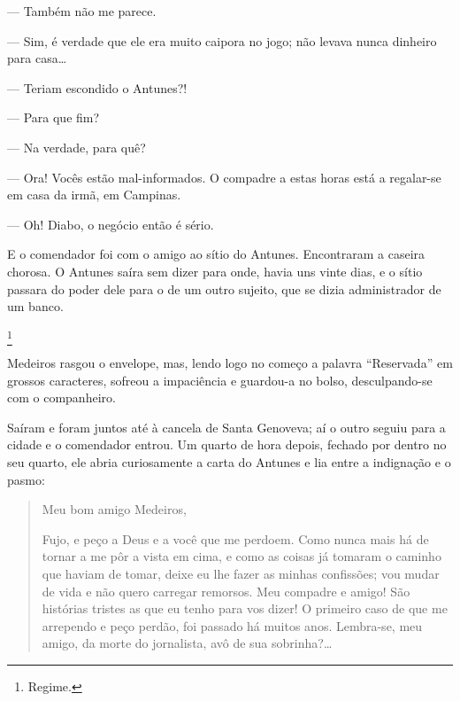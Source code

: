 {--- Também não me parece.

--- Sim, é verdade que ele era muito caipora no jogo; não levava
nunca dinheiro para casa\ldots{}

--- Teriam escondido o Antunes?!

--- Para que fim?

--- Na verdade, para quê?

--- Ora! Vocês estão mal-informados. O compadre a estas
horas está a regalar-se em casa da irmã, em Campinas.


--- Oh! Diabo, o negócio então é sério.

E o comendador foi com o amigo ao sítio do Antunes.
Encontraram a caseira chorosa. O Antunes saíra sem dizer para onde,
havia uns vinte dias, e o sítio passara do poder dele para o de
um outro sujeito, que se dizia administrador de um banco.

\footnote{Regime.}



Medeiros rasgou o envelope, mas, lendo logo no começo a palavra
``Reservada'' em grossos caracteres, sofreou a
impaciência e guardou-a no bolso, desculpando-se com o
companheiro.

Saíram e foram juntos até à cancela de Santa Genoveva;
aí o outro seguiu para a cidade e o comendador entrou. Um quarto de hora
depois, fechado por dentro no seu quarto, ele abria curiosamente a carta
do Antunes e lia entre a indignação e o pasmo:

\begin{quote}
Meu bom amigo Medeiros,
\smallskip

\noindent{}Fujo, e peço a Deus e a você que me
perdoem. Como nunca mais há de tornar a me pôr a vista em cima, e como
as coisas já tomaram o caminho que haviam de tomar, deixe eu lhe fazer
as minhas confissões; vou mudar de vida e não quero carregar remorsos.
Meu compadre e amigo! São histórias tristes as que eu tenho para vos
dizer! O primeiro caso de que me arrependo e peço perdão, foi passado há
muitos anos. Lembra-se, meu amigo, da morte do jornalista, avô de sua
sobrinha?\ldots{}
\end{quote}

}
